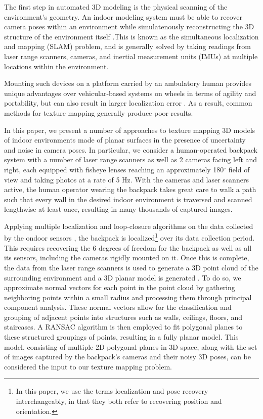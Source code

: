 \documentclass[10pt,twocolumn,letterpaper]{article}
\begin{document}
The first step in automated 3D modeling is the physical scanning of
the environment's geometry. An indoor modeling system must be able to
recover camera poses within an environment while simulatenously
reconstructing the 3D structure of the environment itself
\cite{chen2010indoor, hz, kua2012loopclosure, liu2010indoor}.This is
known as the simultaneous localization and mapping (SLAM) problem, and
is generally solved by taking readings from laser range scanners,
cameras, and inertial measurement units (IMUs) at multiple locations
within the environment.

Mounting such devices on a platform carried by an ambulatory human
provides unique advantages over vehicular-based systems on wheels in
terms of agility and portability, but can also result in larger
localization error \cite{liu2010indoor}. As a result, common methods
for texture mapping generally produce poor results.

In this paper, we present a number of approaches to texture mapping 3D
models of indoor environments made of planar surfaces in the presence
of uncertainty and noise in camera poses. In particular, we consider a
human-operated backpack system with a number of laser range scanners
as well as 2 cameras facing left and right, each equipped with fisheye
lenses reaching an approximately 180$^{\circ}$ field of view and
taking photos at a rate of 5 Hz. With the cameras and laser scanners
active, the human operator wearing the backpack takes great care to
walk a path such that every wall in the desired indoor environment is
traversed and scanned lengthwise at least once, resulting in many
thousands of captured images.

Applying multiple localization and loop-closure algorithms on the data
collected by the ondoor sensors \cite{chen2010indoor,
  kua2012loopclosure, liu2010indoor}, the backpack is
localized\footnote{In this paper, we use the terms localization and
  pose recovery interchangeably, in that they both refer to recovering
  position and orientation.}  over its data collection period. This
requires recovering the 6 degrees of freedom for the backpack as well
as all its sensors, including the cameras rigidly mounted on it. Once
this is complete, the data from the laser range scanners is used to
generate a 3D point cloud of the surrounding environment and a 3D
planar model is generated \cite{sanchez2012point}. To do so, we
approximate normal vectors for each point in the point cloud by
gathering neighboring points within a small radius and processing them
through principal component analysis. These normal vectors allow for
the classification and grouping of adjacent points into structures
such as walls, ceilings, floors, and staircases. A RANSAC algorithm is
then employed to fit polygonal planes to these structured groupings of
points, resulting in a fully planar model. This model, consisting of
multiple 2D polygonal planes in 3D space, along with the set of images
captured by the backpack's cameras and their noisy 3D poses, can be
considered the input to our texture mapping problem.
\end{document}

